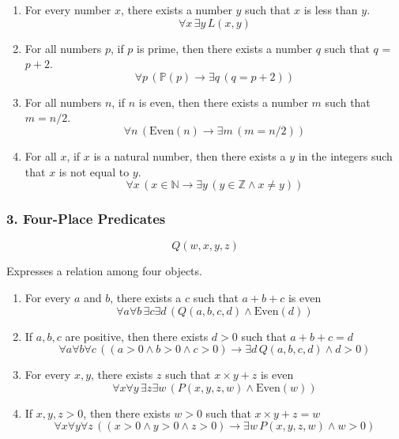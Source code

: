 \begin{enumerate}
\def\labelenumi{\arabic{enumi}.}
\item
  For every number \(x\), there exists a number \(y\) such that \(x\) is
  less than \(y\). \[\forall x \, \exists y \, L(x,y)\]
\item
  For all numbers \(p\), if \(p\) is prime, then there exists a number
  \(q\) such that \(q\) = \(p + 2\).
  \[\forall p \, (\mathbb{P}(p) \rightarrow \exists q \, (q = p+2))\]
\item
  For all numbers \(n\), if \(n\) is even, then there exists a number
  \(m\) such that \(m = n/2\).
  \[\forall n \, (\text{Even}(n) \rightarrow \exists m \, (m = n/2))\]
\item
  For all \(x\), if \(x\) is a natural number, then there exists a \(y\)
  in the integers such that \(x\) is not equal to \(y\).
  \[\forall x \, (x \in \mathbb{N} \rightarrow \exists y \, (y \in \mathbb{Z} \land x \neq y))\]
\end{enumerate}

\subsubsection{3. Four-Place Predicates}\label{four-place-predicates}

\[Q(w,x,y,z)\]

Expresses a relation among four objects.

\begin{enumerate}
\def\labelenumi{\arabic{enumi}.}
\item
  For every \(a\) and \(b\), there exists a \(c\) such that \(a+b+c\) is
  even
  \[\forall a \forall b \, \exists c \exists d \, (Q(a,b,c,d) \land \text{Even}(d))\]
\item
  If \(a,b,c\) are positive, then there exists \(d>0\) such that
  \(a+b+c=d\)
  \[\forall a \forall b \forall c \, ((a>0 \land b>0 \land c>0) \rightarrow \exists d \, Q(a,b,c,d) \land d>0)\]
\item
  For every \(x,y\), there exists \(z\) such that \(x \times y + z\) is
  even
  \[\forall x \forall y \, \exists z \exists w \, (P(x,y,z,w) \land \text{Even}(w))\]
\item
  If \(x,y,z>0\), then there exists \(w>0\) such that
  \(x \times y + z = w\)
  \[\forall x \forall y \forall z \, ((x>0 \land y>0 \land z>0) \rightarrow \exists w \, P(x,y,z,w) \land w>0)\]
\end{enumerate}

